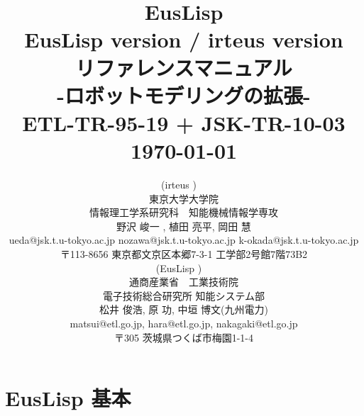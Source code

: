 \documentclass[]{jarticle}
\begin{document}
\newenvironment{refdesc}{
 \vspace{5mm} \parindent=0mm \topsep=0mm \parskip=0mm \leftmargin=10mm}{
             \parindent=10mm \topsep=3mm \parskip=1mm \leftmargin=0mm }


\date{}
\title{{\Huge \bf EusLisp} \\
{\large \bf EusLisp version \eusversion / irteus version \irteusversion} \\
{\LARGE \bf リファレンスマニュアル} \\
{\large -ロボットモデリングの拡張-} \\
\vspace{10mm}
{\large ETL-TR-95-19 + JSK-TR-10-03} \\
{\large \today} \\ }

\author{
(irteus \irteusversion)~~\\
東京大学大学院　\\
情報理工学系研究科　知能機械情報学専攻\\
{\large 野沢 峻一 , 植田 亮平, 岡田 慧} \\
ueda@jsk.t.u-tokyo.ac.jp nozawa@jsk.t.u-tokyo.ac.jp k-okada@jsk.t.u-tokyo.ac.jp\\
〒113-8656 東京都文京区本郷7-3-1 工学部2号館7階73B2 
\\
(EusLisp \eusversion)~~\\
通商産業省　工業技術院 \\
電子技術総合研究所 知能システム部 \\
{\large 松井 俊浩, 原 功, 中垣 博文(九州電力)} \\
matsui@etl.go.jp, hara@etl.go.jp, nakagaki@etl.go.jp\\
〒305 茨城県つくば市梅園1-1-4 \\
}

\thispagestyle{empty}
\maketitle
{}
\tableofcontents

\newpage
{}

\ifeuslisp
\part{EusLisp 基本}




%





\newpage
\end{document}
